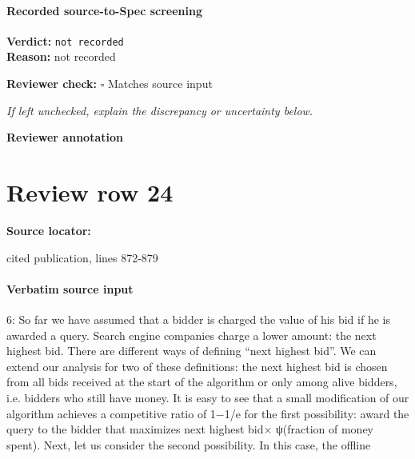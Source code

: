 \documentclass[10pt]{article}
\newcommand{\reviewerbox}{%
  \par\noindent\fbox{\parbox{0.96\linewidth}{\rule{0pt}{0.38in}}}\par
}
\newcommand{\reviewmatch}[1]{%
  \par\noindent\textbf{Reviewer check:} $\square$\; #1\par
  \noindent\emph{If left unchecked, explain the discrepancy or uncertainty below.}\par
}
\begin{document}
\paragraph{Recorded source-to-Spec screening}
\textbf{Verdict:} \texttt{not recorded}
\\
\textbf{Reason:} not recorded
\reviewmatch{Matches source input}
\noindent\textbf{Reviewer annotation}\par
\reviewerbox
\clearpage
\hypertarget{source-claim-ed72f055bf24b97e}{}
\section*{Review row 24}
\textbf{Source locator:} {\footnotesize\raggedright cited publication, lines 872-\allowbreak{}879\par}
\paragraph{Verbatim source input}
\begin{ReviewVerbatim}
6: So far we have assumed that a bidder is charged the value of his bid if he is awarded a query.
Search engine companies charge a lower amount: the next highest bid. There are different ways
of defining “next highest bid”. We can extend our analysis for two of these definitions: the
next highest bid is chosen from all bids received at the start of the algorithm or only among
alive bidders, i.e. bidders who still have money.
It is easy to see that a small modification of our algorithm achieves a competitive ratio of
1−1/e for the first possibility: award the query to the bidder that maximizes next highest bid×
ψ(fraction of money spent). Next, let us consider the second possibility. In this case, the offline
\end{ReviewVerbatim}
\end{document}
